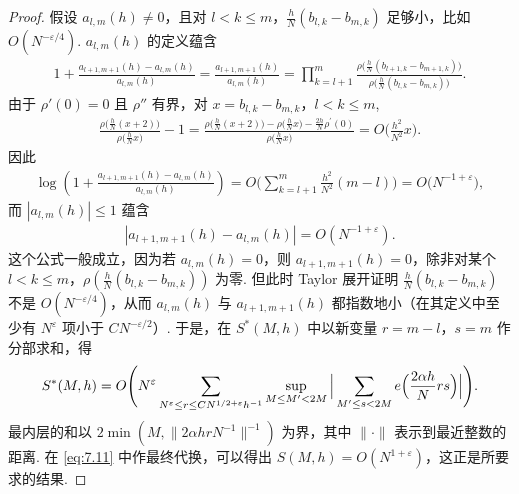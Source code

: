 \begin{proof}
假设 $a_{l,m}(h) \neq 0$，且对 $l < k \leq m$，$\frac{h}{N}(b_{l,k} - b_{m,k})$ 足够小，比如 $O(N^{-\varepsilon/4})$. $a_{l,m}(h)$ 的定义蕴含
\begin{align*}
  1+\frac{a_{l+1,m+1}(h)-a_{l,m}(h)}{a_{l,m}(h)}
  =\frac{a_{l+1,m+1}(h)}{a_{l,m}(h)}
  =\prod_{k=l+1}^{m}\frac{\rho\bigl(\frac{h}{N}(b_{l+1,k}-b_{m+1,k})\bigr)}
  {\rho\bigl(\frac{h}{N}(b_{l,k}-b_{m,k})\bigr)}.
\end{align*}
由于 $\rho'(0) = 0$ 且 $\rho''$ 有界，对 $x = b_{l,k} - b_{m,k}$，$l < k \leq m$,
\begin{align*}
  \frac{\rho\bigl(\frac{h}{N}(x+2)\bigr)}{\rho\bigl(\frac{h}{N}x\bigr)}-1
  =\frac{\rho\bigl(\frac{h}{N}(x+2)\bigr)-\rho\bigl(\frac{h}{N}x\bigr)-\frac{2h}{N}\rho^{\prime}(0)}
  {\rho\bigl(\frac{h}{N}x\bigr)}
  =O\Big(\frac{h^{2}}{N^{2}}x\Big).
\end{align*}
因此
\begin{align*}
  \log\left(1+\frac{a_{l+1,m+1}(h)-a_{l,m}(h)}{a_{l,m}(h)}\right)
  =O\Big(\sum_{k=l+1}^{m}\frac{h^{2}}{N^{2}}(m-l)\Big)
  =O\bigl(N^{-1+\varepsilon}\bigr),
\end{align*}
而 $|a_{l,m}(h)| \leq 1$ 蕴含
\begin{align*}
  |a_{l+1,m+1}(h)-a_{l,m}(h)|=O(N^{-1+\varepsilon}).
\end{align*}
这个公式一般成立，因为若 $a_{l,m}(h) = 0$，则 $a_{l+1,m+1}(h) = 0$，除非对某个 $l < k \leq m$，$\rho\left(\frac{h}{N}(b_{l,k} - b_{m,k})\right)$ 为零. 但此时 Taylor 展开证明 $\frac{h}{N}(b_{l,k} - b_{m,k})$ 不是 $O(N^{-\varepsilon/4})$，从而 $a_{l,m}(h)$ 与 $a_{l+1,m+1}(h)$ 都指数地小（在其定义中至少有 $N^{\varepsilon}$ 项小于 $CN^{-\varepsilon/2}$）. 于是，在 $S^*(M,h)$ 中以新变量 $r = m - l$，$s = m$ 作分部求和，得
\begin{align*}
  S^{*}(M,h)=O\Biggl(N^{\varepsilon}\sum_{N^{\varepsilon}\leq r\leq CN^{1/2+\varepsilon}h^{-1}}
  \sup_{M\leq M^{\prime}<2M}\Big|\sum_{M^{\prime}\leq s<2M}
  e\Bigl(\frac{2\alpha h}{N}r s\Bigr)\Big|\Biggr).
\end{align*}
最内层的和以 $2\min(M, \|2\alpha hrN^{-1}\|^{-1})$ 为界，其中 $\|\cdot\|$ 表示到最近整数的距离. 在 \eqref{eq:7.11} 中作最终代换，可以得出 $S(M, h) = O(N^{1+\varepsilon})$，这正是所要求的结果.
\end{proof}

